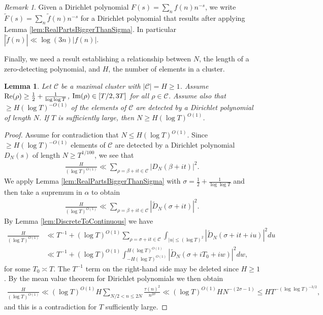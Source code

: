 \documentclass[12pt]{amsart}
\theoremstyle{plain}
\newtheorem{lemma}[theorem]{Lemma}
\theoremstyle{definition}
\theoremstyle{remark}
\newtheorem{remark}[theorem]{Remark}
\begin{document}
%
%
%
%
\begin{remark}
Given a Dirichlet polynomial $F(s) = \sum_n f(n)n^{-s}$, we write $\tilde{F}(s) = \sum_n \tilde{f}(n) n^{-s}$ for a Dirichlet polynomial that results after applying Lemma \ref{lem:RealPartsBiggerThanSigma}. In particular $|\tilde{f}(n)| \ll \log(3n) |f(n)|$.
\end{remark}
%
%
%
%
Finally, we need a result establishing a relationship between $N$, the length of a zero-detecting polynomial, and $H$, the number of elements in a cluster.
%
%
%
%
\begin{lemma}\label{lmm:MaxClustersShort}
Let $\mathcal{C}$ be a maximal cluster with $|\mathcal{C}| = H\geq 1$. Assume $\textup{Re}(\rho) \geq \frac{1}{2} + \frac{1}{\log \log T}$, $\textup{Im}(\rho) \in [T/2,3T]$ for all $\rho \in \mathcal{C}$. Assume also that $\geq H(\log T)^{-O(1)}$ of the elements of $\mathcal{C}$ are detected by a Dirichlet polynomial of length $N$. If $T$ is sufficiently large, then $N \geq H (\log T)^{O(1)}$.
\end{lemma}
%
%
%
%
\begin{proof}
Assume for contradiction that $N \leq H(\log T)^{O(1)}$. Since $\geq H(\log T)^{-O(1)}$ elements of $\mathcal{C}$ are detected by a Dirichlet polynomial $D_N(s)$ of length $N\geq T^{1/100}$, we see that
\begin{align*}
\frac{H}{(\log T)^{O(1)}} \ll \sum_{\rho=\beta+it \in \mathcal{C}} \left|D_N(\beta+it) \right|^2.
\end{align*}
We apply Lemma \ref{lem:RealPartsBiggerThanSigma} with $\sigma = \frac{1}{2} + \frac{1}{\log \log T}$ and then take a supremum in $\alpha$ to obtain
\begin{align*}
\frac{H}{(\log T)^{O(1)}} \ll \sum_{\rho=\beta+it \in \mathcal{C}} \left|\widetilde{D}_N(\sigma+it) \right|^2.
\end{align*}
By Lemma \ref{lem:DiscreteToContinuous} we have
\begin{align*}
\frac{H}{(\log T)^{O(1)}} &\ll T^{-1} +  (\log T)^{O(1)} \sum_{\rho=\sigma+it \in \mathcal{C}} \int_{|u|\leq (\log T)^2}|\widetilde{D}_N(\sigma+it+iu)|^2 du \\
&\ll T^{-1} + (\log T)^{O(1)} \int_{-H(\log T)^{O(1)}}^{H(\log T)^{O(1)}}|\widetilde{D}_N(\sigma+iT_0 + iw)|^2 dw,
\end{align*}
for some $T_0 \asymp T$. The $T^{-1}$ term on the right-hand side may be deleted since $H \geq 1$. By the mean value theorem for Dirichlet polynomials \cite[Theorem 9.1]{IK2004} we then obtain
\begin{align*}
\frac{H}{(\log T)^{O(1)}} \ll (\log T)^{O(1)} H \sum_{N/2 < n \leq 2N} \frac{\tau(n)^2}{n^{2\sigma}} \ll (\log T)^{O(1)} H N^{-(2\sigma - 1)}\leq H T^{-(\log \log T)^{-3/2}},
\end{align*}
and this is a contradiction for $T$ sufficiently large.
\end{proof}
\end{document}
